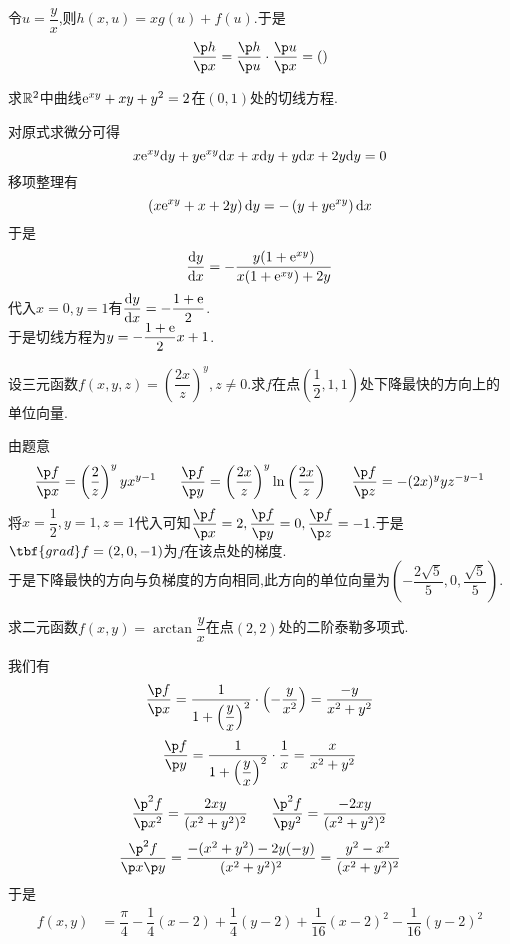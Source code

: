 \documentclass{ctexart}
\begin{document}
\begin{solution}[Solution.]
    令$u=\dfrac{y}{x}$,则$h(x,u)=xg(u)+f(u)$.于是
    $$\dfrac{\p h}{\p x}=\dfrac{\p h}{\p u}\cdot\dfrac{\p u}{\p x}=\left(\right)$$
\end{solution}
\begin{problem}[4.(10\songti{分})]
    求$\mathbb{R}^2$中曲线$\mathrm{e}^{xy}+xy+y^2=2$在$(0,1)$处的切线方程.
\end{problem}
\begin{solution}[Solution.]
    对原式求微分可得
    $$x\mathrm{e}^{xy}\mathrm{d} y+y\mathrm{e}^{xy}\mathrm{d} x+x\mathrm{d} y+y\mathrm{d} x+2y\mathrm{d} y=0$$
    移项整理有$$\left(x\mathrm{e}^{xy}+x+2y\right)\mathrm{d} y=-\left(y+y\mathrm{e}^{xy}\right)\mathrm{d} x$$
    于是$$\dfrac{\mathrm{d} y}{\mathrm{d} x}=-\dfrac{y(1+\mathrm{e}^{xy})}{x(1+\mathrm{e}^{xy})+2y}$$
    代入$x=0,y=1$有$\dfrac{\mathrm{d} y}{\mathrm{d} x}=-\dfrac{1+\mathrm{e}}{2}$.\\
    于是切线方程为$y=-\dfrac{1+\mathrm{e}}{2}x+1$.
\end{solution}
\begin{problem}[5.(10\songti{分})]
    设三元函数$f(x,y,z)=\left(\dfrac{2x}{z}\right)^{y},z\neq0$.求$f$在点$\left(\dfrac{1}{2},1,1\right)$处下降最快的方向上的单位向量.
\end{problem}
\begin{solution}[Solution.]
    由题意$$\dfrac{\p f}{\p x}=\left(\dfrac{2}{z}\right)^yyx^{y-1}\ \ \ \ \ 
    \dfrac{\p f}{\p y}=\left(\dfrac{2x}{z}\right)^y\ln\left(\dfrac{2x}{z}\right)\ \ \ \ \
    \dfrac{\p f}{\p z}=-(2x)^yyz^{-y-1}$$
    将$x=\dfrac12,y=1,z=1$代入可知$\dfrac{\p f}{\p x}=2,\dfrac{\p f}{\p y}=0,\dfrac{\p f}{\p z}=-1$.于是$\tbf{grad}f=\left(2,0,-1\right)$为$f$在该点处的梯度.\\
    于是下降最快的方向与负梯度的方向相同,此方向的单位向量为$\left(-\dfrac{2\sqrt5}{5},0,\dfrac{\sqrt5}{5}\right)$.
\end{solution}
\begin{problem}[6.(10\songti{分})]
    求二元函数$f(x,y)=\arctan\dfrac{y}{x}$在点$(2,2)$处的二阶泰勒多项式.
\end{problem}
\begin{solution}[Solution.]
    我们有\\
    $$\dfrac{\p f}{\p x}=\dfrac{1}{1+\left(\dfrac{y}{x}\right)^2}\cdot\left(-\dfrac{y}{x^2}\right)=\dfrac{-y}{x^2+y^2}$$
    $$\dfrac{\p f}{\p y}=\dfrac{1}{1+\left(\dfrac{y}{x}\right)^2}\cdot\dfrac{1}{x}=\dfrac{x}{x^2+y^2}$$
    $$\dfrac{\p^2f}{\p x^2}=\dfrac{2xy}{(x^2+y^2)^2}\ \ \ \ \ \dfrac{\p^2f}{\p y^2}=\dfrac{-2xy}{(x^2+y^2)^2}$$
    $$\dfrac{\p^2f}{\p x\p y}=\dfrac{-(x^2+y^2)-2y(-y)}{(x^2+y^2)^2}=\dfrac{y^2-x^2}{(x^2+y^2)^2}$$
    于是
    \[\begin{aligned}
        f(x,y)
        &= \dfrac{\pi}{4}-\dfrac14(x-2)+\dfrac14(y-2)+\dfrac{1}{16}(x-2)^2-\dfrac{1}{16}(y-2)^2
    \end{aligned}\]
\end{solution}
\end{document}
